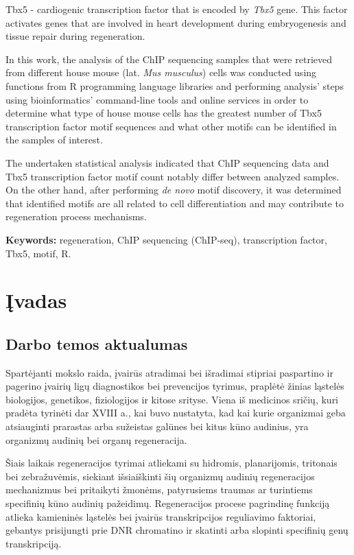\documentclass[12pt]{article}
\begin{document}
Tbx5 - cardiogenic transcription factor that is encoded by \emph{Tbx5} gene.
This factor activates genes that are involved in heart development during
embryogenesis and tissue repair during regeneration.

In this work, the analysis of the ChIP sequencing samples that were
retrieved from different house mouse (lat. \emph{Mus musculus}) cells was
conducted using functions from R programming language libraries and performing
analysis' steps using bioinformatics' command-line tools and online services
in order to determine what type of house mouse cells has the greatest number
of Tbx5 transcription factor motif sequences and what other motifs can be
identified in the samples of interest.

The undertaken statistical analysis indicated that ChIP sequencing data and
Tbx5 transcription factor motif count notably differ between analyzed
samples. On the other hand, after performing \emph{de novo} motif discovery, it
was determined that identified motifs are all related to cell differentiation
and may contribute to regeneration process mechanisms.

\hfill \break
\textbf{Keywords:} regeneration, ChIP sequencing (ChIP-seq),
    transcription factor, Tbx5, motif, R.
\newpage


\section{Įvadas}
\subsection*{Darbo temos aktualumas}

Spartėjanti mokslo raida, įvairūs atradimai bei išradimai stipriai paspartino
ir pagerino įvairių ligų diagnostikos bei prevencijos tyrimus, praplėtė žinias
ląstelės biologijos, genetikos, fiziologijos ir kitose srityse. Viena iš
medicinos sričių, kuri pradėta tyrinėti dar XVIII a., kai buvo nustatyta, kad
kai kurie organizmai geba atsiauginti prarastas arba sužeistas galūnes bei
kitus kūno audinius\cite{REGENERATION}, yra organizmų audinių bei organų
regeneracija.

Šiais laikais regeneracijos tyrimai atliekami su hidromis, planarijomis,
tritonais bei zebražuvėmis\cite{ORGANISMS}, siekiant išsiaiškinti šių organizmų
audinių regeneracijos mechanizmus bei pritaikyti žmonėms, patyrusiems traumas
ar turintiems specifinių kūno audinių pažeidimų. Regeneracijos procese
pagrindinę funkciją atlieka kamieninės ląstelės bei įvairūs transkripcijos
reguliavimo faktoriai, gebantys prisijungti prie DNR chromatino ir skatinti
arba slopinti specifinių genų transkripciją.
\end{document}
